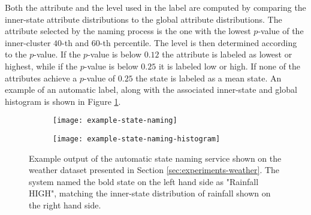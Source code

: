 Both the attribute and the level used in the label are computed by comparing the inner-state attribute
distributions to the global attribute distributions. The attribute selected by the naming process is
the one with the lowest $p$-value of the inner-cluster $40$-th and $60$-th percentile. The level is
then determined according to the $p$-value. If the $p$-value is below $0.12$ the attribute is labeled
as lowest or highest, while if the $p$-value is below $0.25$ it is labeled low or high. If none of the
attributes achieve a $p$-value of $0.25$ the state is labeled as a mean state. An example of an automatic
label, along with the associated inner-state and global histogram is shown in Figure \ref{fig:example-naming}.

\begin{figure}[h!]
	\centering
	\begin{subfigure}{.48\columnwidth}
	  	\centering
	  	\texttt{[image: example-state-naming]}
	\end{subfigure}
	\begin{subfigure}{.48\columnwidth}
	  	\centering
	  	\texttt{[image: example-state-naming-histogram]}
	\end{subfigure}
	\caption{Example output of the automatic state naming service shown on the weather dataset presented in Section \ref{sec:experiments-weather}. The system named the bold state on the left hand side as "Rainfall HIGH", matching the inner-state distribution of rainfall shown on the right hand side.}
	\label{fig:example-naming}
\end{figure}

\iffalse
In order to assist the user in identifying the meaning of states, the system provides automatic default
state names, based on the distribution of attributes in the state. Each state is given a default name
by combining its most outstanding attribute with a discrete level: LOWEST, LOW, HIGH or
HIGHEST.

The attribute and the level are chosen by comparing its distribution inside the state to the global
distribution in all the states through histograms. This is achieved by first computing the percentiles
of the global distribution. The $40^{th}$ percentile is then computed for the state distribution and
compared against the global distribution. If this percentile lies below the $25^{th}$ or $12^{th}$
percentile, the state is marked with LOW or LOWEST respectively. The final name is chosen according
to the attribute which lies in the lowest percentile.
\fi

